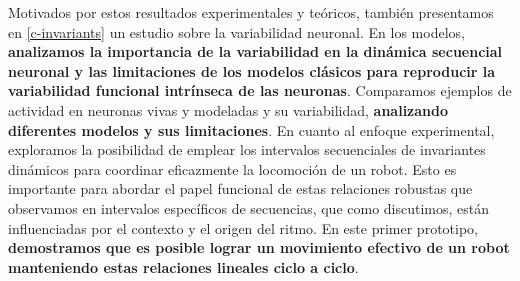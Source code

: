 Motivados por estos resultados experimentales y teóricos, también presentamos en \ref{c-invariants} un estudio sobre la variabilidad neuronal. En los modelos, \textbf{analizamos la importancia de la variabilidad en la dinámica secuencial neuronal y las limitaciones de los modelos clásicos para reproducir la variabilidad funcional intrínseca de las neuronas}. Comparamos ejemplos de actividad en neuronas vivas y modeladas y su variabilidad, \textbf{analizando diferentes modelos y sus limitaciones}. En cuanto al enfoque experimental, exploramos la posibilidad de emplear los intervalos secuenciales de invariantes dinámicos para coordinar eficazmente la locomoción de un robot. Esto es importante para abordar el papel funcional de estas relaciones robustas que observamos en intervalos específicos de secuencias, que como discutimos, están influenciadas por el contexto y el origen del ritmo. En este primer prototipo, \textbf{demostramos que es posible lograr un movimiento efectivo de un robot manteniendo estas relaciones lineales ciclo a ciclo}.

